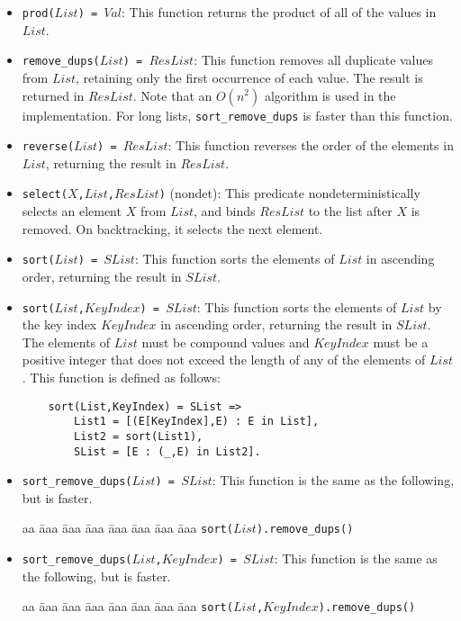 \begin{itemize}
\item \texttt{prod($List$) = $Val$}: This function returns the product of all of the values in $List$. 
\item \texttt{remove\_dups($List$) = $ResList$}: This function removes all duplicate values from $List$, retaining only the first occurrence of each value.  The result is returned in $ResList$. Note that an $O(n^2)$ algorithm is used in the implementation. For long lists, \texttt{sort\_remove\_dups} is faster than this function.
\item \texttt{reverse($List$) = $ResList$}: This function reverses the order of the elements in $List$, returning the result in $ResList$. 
\item \texttt{select($X$,$List$,$ResList$)} (nondet): This predicate nondeterministically selects an element $X$ from $List$, and binds $ResList$ to the list after $X$ is removed. On backtracking, it selects the next element.
\item \texttt{sort($List$) = $SList$}: This function sorts the elements of $List$ in ascending order, returning the result in $SList$. 
\item \texttt{sort($List$,$KeyIndex$) = $SList$}: This function sorts the elements of $List$ by the key index $KeyIndex$ in ascending order, returning the result in $SList$. The elements of $List$ must be compound values and $KeyIndex$ must be a positive integer that does not exceed the length of any of the elements of $List$. This function is defined as follows:
\begin{verbatim}
    sort(List,KeyIndex) = SList =>
        List1 = [(E[KeyIndex],E) : E in List],
        List2 = sort(List1),
        SList = [E : (_,E) in List2].
\end{verbatim}

\item \texttt{sort\_remove\_dups($List$) = $SList$}: This function is the same as the following, but is faster.
\begin{tabbing}
aa \= aaa \= aaa \= aaa \=aaa \= aaa \= aaa \= aaa \kill
\> \texttt{sort($List$).remove\_dups()}
\end{tabbing}

\item \texttt{sort\_remove\_dups($List$,$KeyIndex$) = $SList$}: This function is the same as the following, but is faster.
\begin{tabbing}
aa \= aaa \= aaa \= aaa \=aaa \= aaa \= aaa \= aaa \kill
\> \texttt{sort($List$,$KeyIndex$).remove\_dups()}
\end{tabbing}


\end{itemize}
